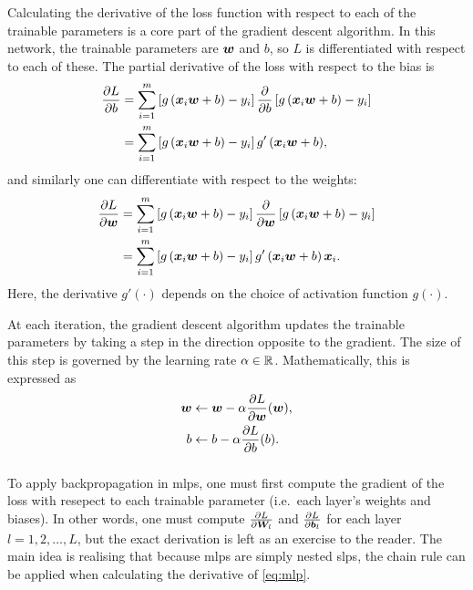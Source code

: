 \documentclass[../report.tex]{subfiles}
\begin{document}
Calculating the derivative of the loss function with respect to each of the trainable parameters is a core part of the gradient descent algorithm.
In this network, the trainable parameters are ${\bm{w}}$ and $b$, so $L$ is differentiated with respect to each of these.
The partial derivative of the loss with respect to the bias is
\begin{align}
    \label{eq:backprop_dL_db}
    \frac{\partial L}{\partial b}
    &= \sum_{i=1}^m{
        \left[g \left({\bm{x}}_i{\bm{w}}+b\right) - y_i \right]
        \frac{\partial}{\partial b} \left[g \left({\bm{x}}_i{\bm{w}}+b\right) - y_i \right]
    } \nonumber \\
    &= \sum_{i=1}^m{
        \left[g \left({\bm{x}}_i{\bm{w}}+b\right) - y_i \right]
        g' \left({\bm{x}}_i{\bm{w}}+b\right)
    },
\end{align}
and similarly one can differentiate with respect to the weights:
\begin{align}
    \label{eq:backprop_dL_dw}
    \frac{\partial L}{\partial {\bm{w}}}
    &= \sum_{i=1}^m{
        \left[g \left({\bm{x}}_i{\bm{w}}+b\right) - y_i \right]
        \frac{\partial}{\partial {\bm{w}}} \left[g \left({\bm{x}}_i{\bm{w}}+b\right) - y_i \right]
    } \nonumber \\
    &= \sum_{i=1}^m{
        \left[g \left({\bm{x}}_i{\bm{w}}+b\right) - y_i \right]
        g' \left({\bm{x}}_i{\bm{w}}+b\right)
        {\bm{x}}_i
    }.
\end{align}
Here, the derivative $g'(\cdot)$ depends on the choice of activation function $g(\cdot)$.

At each iteration, the gradient descent algorithm updates the trainable parameters by taking a step in the direction opposite to the gradient.
The size of this step is governed by the learning rate $\alpha \in \mathbb{R}$.
Mathematically, this is expressed as
\begin{align}
    \label{eq:backprop_update_weights}
    {\bm{w}} &\gets {\bm{w}} - \alpha \frac{\partial L}{\partial {\bm{w}}}({\bm{w}}),\\
    \label{eq:backprop_update_bias}
    b &\gets b - \alpha \frac{\partial L}{\partial b}(b).
\end{align}

\subsubsection{}
\label{sec:mlp_training}
To apply backpropagation in \glspl{mlp}, one must first compute the gradient of the loss with resepect to each trainable parameter (i.e.\ each layer's weights and biases).
In other words, one must compute $\frac{\partial L}{\partial {\bm{W}}_l}$ and $\frac{\partial L}{\partial {\bm{b}}_l}$ for each layer $l=1,2,\dots,L$, but the exact derivation is left as an exercise to the reader.
The main idea is realising that because \glspl{mlp} are simply nested \glspl{slp}, the chain rule can be applied when calculating the derivative of \cref{eq:mlp}.
\end{document}
